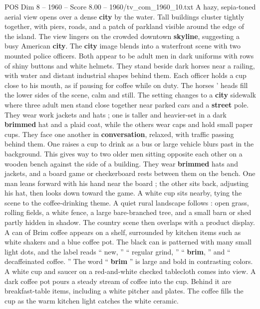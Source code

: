\begin{textsample}{POS Dim 8 – 1960 – Score 8.00 – 1960/tv\_com\_1960\_10.txt}  \label{ex:f8_pos_082}
A hazy, sepia-toned aerial view opens over a dense \textbf{city} by the water.
Tall buildings cluster tightly together, with piers, roads, and a patch of parkland visible around the edge of the island.
The view lingers on the crowded downtown \textbf{skyline}, suggesting a busy American \textbf{city}.
The \textbf{city} image blends into a waterfront scene with two mounted police officers.
Both appear to be adult men in dark uniforms with rows of shiny buttons and white helmets.
They stand beside dark horses near a railing, with water and distant industrial shapes behind them.
Each officer holds a cup close to his mouth, as if pausing for coffee while on duty.
The horses ’ heads fill the lower sides of the scene, calm and still.
The setting changes to a \textbf{city} sidewalk where three adult men stand close together near parked cars and a \textbf{street} pole.
They wear work jackets and hats ; one is taller and heavier-set in a dark \textbf{brimmed} hat and a plaid coat, while the others wear caps and hold small paper cups.
They face one another in \textbf{conversation}, relaxed, with traffic passing behind them.
One raises a cup to drink as a bus or large vehicle blurs past in the background.
This gives way to two older men sitting opposite each other on a wooden bench against the side of a building.
They wear \textbf{brimmed} hats and jackets, and a board game or checkerboard rests between them on the bench.
One man leans forward with his hand near the board ; the other sits back, adjusting his hat, then looks down toward the game.
A white cup sits nearby, tying the scene to the coffee-drinking theme.
A quiet rural landscape follows : open grass, rolling fields, a white fence, a large bare-branched tree, and a small barn or shed partly hidden in shadow.
The country scene then overlaps with a product display.
A can of Brim coffee appears on a shelf, surrounded by kitchen items such as white shakers and a blue coffee pot.
The black can is patterned with many small light dots, and the label reads “ new, ” “ regular grind, ” “ \textbf{brim}, ” and “ decaffeinated coffee. ” The word “ \textbf{brim} ” is large and bold in contrasting colors.
A white cup and saucer on a red-and-white checked tablecloth comes into view.
A dark coffee pot pours a steady stream of coffee into the cup.
Behind it are breakfast-table items, including a white pitcher and plates.
The coffee fills the cup as the warm kitchen light catches the white ceramic.

\end{textsample}
